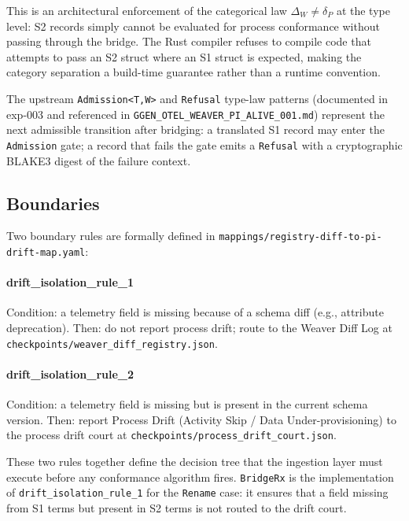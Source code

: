 This is an architectural enforcement of the categorical law
$\Delta_W \neq \delta_P$ at the type level: S2 records simply cannot be evaluated
for process conformance without passing through the bridge. The Rust compiler
refuses to compile code that attempts to pass an S2 struct where an S1 struct is
expected, making the category separation a build-time guarantee rather than a
runtime convention.

The upstream \texttt{Admission<T,W>} and \texttt{Refusal} type-law patterns
(documented in exp-003 and referenced in \texttt{GGEN\_OTEL\_WEAVER\_PI\_ALIVE\_001.md})
represent the next admissible transition after bridging: a translated S1 record
may enter the \texttt{Admission} gate; a record that fails the gate emits a
\texttt{Refusal} with a cryptographic BLAKE3 digest of the failure context.

\subsection{Boundaries}
\label{sec:otel-weaver-exp-002-diff-to-residual-arch-boundaries}

Two boundary rules are formally defined in
\texttt{mappings/registry-diff-to-pi-drift-map.yaml}:

\paragraph{drift\_isolation\_rule\_1}
Condition: a telemetry field is missing because of a schema diff (e.g., attribute
deprecation). Then: do not report process drift; route to the Weaver Diff Log at
\texttt{checkpoints/weaver\_diff\_registry.json}.

\paragraph{drift\_isolation\_rule\_2}
Condition: a telemetry field is missing but is present in the current schema version.
Then: report Process Drift (Activity Skip / Data Under-provisioning) to the process
drift court at \texttt{checkpoints/process\_drift\_court.json}.

These two rules together define the decision tree that the ingestion layer must
execute before any conformance algorithm fires. \texttt{BridgeRx} is the
implementation of \texttt{drift\_isolation\_rule\_1} for the \texttt{Rename} case:
it ensures that a field missing from S1 terms but present in S2 terms is not routed
to the drift court.

